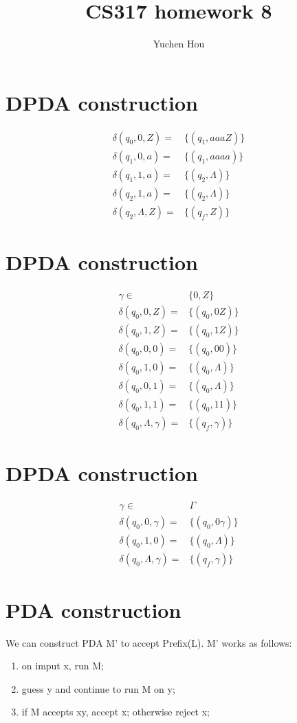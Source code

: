 \documentclass{article}
\begin{document}
\lstset{language=Java}
\title{CS317 homework 8}
\author{Yuchen Hou}
\maketitle

\section{DPDA construction}
\begin{align*}
\delta(q_0, 0, Z) =& \{(q_1, aaaZ)\}\\
\delta(q_1, 0, a) =& \{(q_1, aaaa)\}\\
\delta(q_1, 1, a) =& \{(q_2, \Lambda)\}\\
\delta(q_2, 1, a) =& \{(q_2, \Lambda)\}\\
\delta(q_2, \Lambda, Z) =& \{(q_f, Z)\}
\end{align*}

\section{DPDA construction}
\begin{align*}
\gamma \in& \{0, Z\}\\
\delta(q_0, 0, Z) =& \{(q_0, 0 Z)\}\\
\delta(q_0, 1, Z) =& \{(q_0, 1 Z)\}\\
\delta(q_0, 0, 0) =& \{(q_0, 00)\}\\
\delta(q_0, 1, 0) =& \{(q_0, \Lambda)\}\\
\delta(q_0, 0, 1) =& \{(q_0, \Lambda)\}\\
\delta(q_0, 1, 1) =& \{(q_0, 11)\}\\
\delta(q_0, \Lambda, \gamma) =& \{(q_f, \gamma)\}
\end{align*}

\section{DPDA construction}
\begin{align*}
\gamma \in& \Gamma\\
\delta(q_0, 0, \gamma) =& \{(q_0, 0\gamma)\}\\
\delta(q_0, 1, 0) =& \{(q_0, \Lambda)\}\\
\delta(q_0, \Lambda, \gamma) =& \{(q_f, \gamma)\}
\end{align*}

\section{PDA construction}
We can construct PDA M' to accept Prefix(L). M' works as follows:
\begin{enumerate}
  \item on imput x, run M;
  \item guess y and continue to run M on y;
  \item if M accepts xy, accept x; otherwise reject x;
\end{enumerate}
\end{document}
